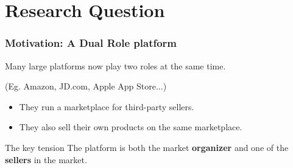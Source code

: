 ﻿\section{Research Question}

\begin{frame}
  \frametitle{Motivation: A Dual Role platform}
  Many large platforms now play two roles at the same time.

  (Eg. Amazon, JD.com, Apple App Store...)

  \begin{itemize}
    \item They run a marketplace for third-party sellers.
    \item They also sell their own products on the same marketplace.
  \end{itemize}

  \begin{block}{The key tension}
    The platform is both the market \textbf{organizer} and one of the \textbf{sellers} in the market.
  \end{block}
\end{frame}


